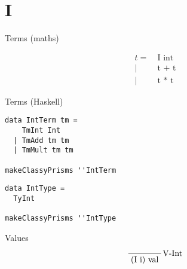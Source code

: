 \documentclass{beamer}
\begin{document}
\section{I}

\begin{frame}[c]
  \begin{center}
Terms (maths) 
  \end{center}
  \begin{displaymath}
    \begin{aligned}
t =& \ \text{I int} \\
  |& \ \text{t + t} \\
  |& \ \text{t * t}
    \end{aligned}
  \end{displaymath}
\end{frame}

\begin{frame}[fragile]
  \begin{center}
Terms (Haskell) 
  \end{center}
  \begin{verbatim}
data IntTerm tm =
    TmInt Int
  | TmAdd tm tm
  | TmMult tm tm

makeClassyPrisms ''IntTerm
  \end{verbatim}
\end{frame} 

\begin{frame}[fragile]
\begin{verbatim}
data IntType =
  TyInt

makeClassyPrisms ''IntType
\end{verbatim}
\end{frame}

\begin{frame}[c]
  Values
  \begin{displaymath}  
    \prftree[r]{V-Int}
    {\text{(I i) val}}
  \end{displaymath} 
\end{frame}
\end{document}
